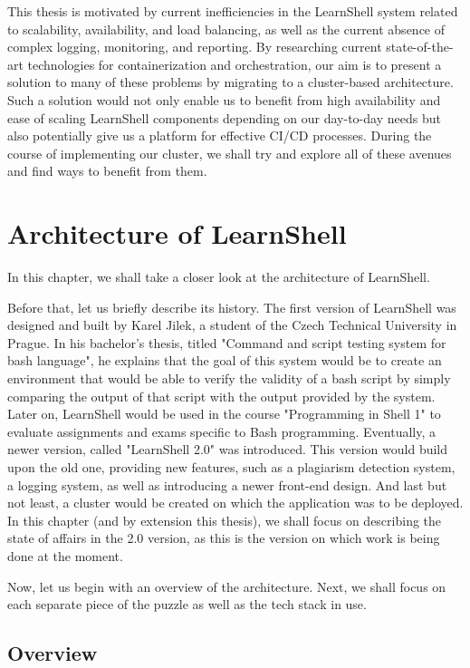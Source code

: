 \documentclass[thesis=B,english]{FITthesis}[2019/12/23]
\begin{document}
This thesis is motivated by current inefficiencies in the LearnShell system related to scalability, availability, and load balancing, as well as the current absence of complex logging, monitoring, and reporting. By researching current state-of-the-art technologies for containerization and orchestration, our aim is to present a solution to many of these problems by migrating to a cluster-based architecture. Such a solution would not only enable us to benefit from high availability and ease of scaling LearnShell components depending on our day-to-day needs but also potentially give us a platform for effective CI/CD processes. During the course of implementing our cluster, we shall try and explore all of these avenues and find ways to benefit from them.


\chapter{Architecture of LearnShell}

In this chapter, we shall take a closer look at the architecture of LearnShell.

Before that, let us briefly describe its history. The first version of LearnShell was designed and built by Karel Jilek, a student of the Czech Technical University in Prague. In his bachelor's thesis, titled "Command and script testing system for bash language", he explains that the goal of this system would be to create an environment that would be able to verify the validity of a bash script by simply comparing the output of that script with the output provided by the system. \cite{learnshell-jilek} Later on, LearnShell would be used in the course "Programming in Shell 1" to evaluate assignments and exams specific to Bash programming. Eventually, a newer version, called "LearnShell 2.0" was introduced. This version would build upon the old one, providing new features, such as a plagiarism detection system, a logging system, as well as introducing a newer front-end design. And last but not least, a cluster would be created on which the application was to be deployed. In this chapter (and by extension this thesis), we shall focus on describing the state of affairs in the 2.0 version, as this is the version on which work is being done at the moment.

Now, let us begin with an overview of the architecture. Next, we shall focus on each separate piece of the puzzle as well as the tech stack in use.

\section{Overview}
\end{document}
